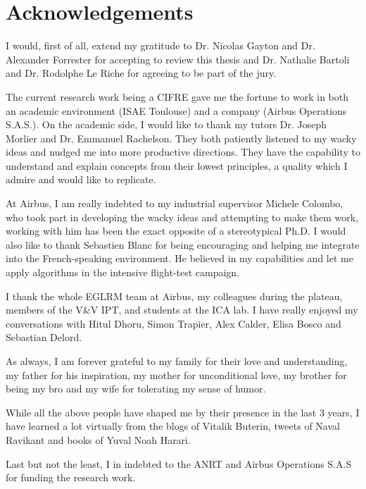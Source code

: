 \chapter*{Acknowledgements}
I would, first of all, extend my gratitude to Dr. Nicolas Gayton and Dr. Alexander Forrester for accepting to review this thesis and Dr. Nathalie Bartoli and Dr. Rodolphe Le Riche for agreeing to be part of the jury. 

The current research work being a CIFRE gave me the fortune to work in both an academic environment (ISAE Toulouse) and a company (Airbus Operations S.A.S.). On the academic side, I would like to thank my tutors Dr. Joseph Morlier and  Dr. Emmanuel Rachelson. They both patiently listened to my wacky ideas and nudged me into more productive directions. They have the capability to understand and explain concepts from their lowest principles, a quality which I admire and would like to replicate.  

At Airbus, I am really indebted to my industrial supervisor Michele Colombo, who took part in developing the wacky ideas and attempting to make them work, working with him has been the exact opposite of a stereotypical Ph.D. I would also like to thank Sebastien Blanc for being encouraging and helping me integrate into the French-speaking environment. He believed in my capabilities and let me apply algorithms in the intensive flight-test campaign. 

I thank the whole EGLRM team at Airbus, my colleagues during the plateau, members of the V\&V IPT, and students at the ICA lab. I have really enjoyed my conversations with Hitul Dhoru, Simon Trapier, Alex Calder, Elisa Bosco and Sebastian Delord. 

As always, I am forever grateful to my family for their love and understanding, my father for his inspiration, my mother for unconditional love, my brother for being my bro and my wife for tolerating my sense of humor. 

While all the above people have shaped me by their presence in the last 3 years, I have learned a lot virtually from the blogs of Vitalik Buterin, tweets of Naval Ravikant and books of Yuval Noah Harari. 

Last but not the least, I in indebted to the ANRT and Airbus Operations S.A.S for funding the research work. 
